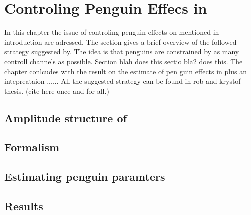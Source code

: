 
\chapter{Controling Penguin Effecs in \phis}
\label{Penguins}

In this chapter the issue of controling penguin effects on \phis mentioned in introduction are adressed.
The section gives a brief overview of the followed strategy suggested by.
The idea is that penguins are constrained by as many controll channels as possible.
Section blah does this sectio bla2 does this. The chapter conlcudes with the result on the estimate of pen guin effects in \phis
plus an intepreataion ......
All the suggested strategy can be found in rob and krystof thesis. (cite here once and for all.)

\section{Amplitude structure of \BsJpsiPhi}
\label{jpsiphi_amp_struct}


\section{Formalism}
\label{penguin_formalism}


\section{Estimating penguin paramters}
\label{penguin_more_chanells}


\section{Results}
\label{penguin_results}

